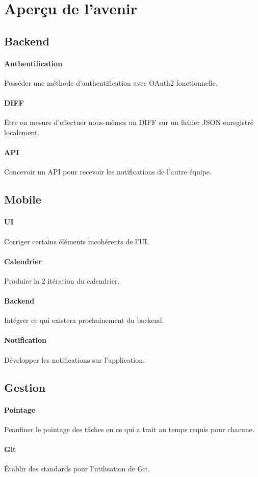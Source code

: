 \section{Aperçu de l'avenir}
	\subsection{Backend}

	\paragraph{Authentification} Posséder une méthode d'authentification avec OAuth2 fonctionnelle.

	\paragraph{DIFF} Être en mesure d'effectuer nous-mêmes un DIFF sur un fichier JSON enregistré localement.

	\paragraph{API} Concevoir un API pour recevoir les notifications de l'autre équipe.
	
	\subsection{Mobile}
	
	\paragraph{UI} Corriger certains éléments incohérents de l'UI.
	\paragraph{Calendrier} Produire la 2\ieme{} itération du calendrier.
	\paragraph{Backend} Intégrer ce qui existera prochainement du backend.
	\paragraph{Notification} Développer les notifications sur l'application.
	
	\subsection{Gestion}
	
	\paragraph{Pointage} Peaufiner le pointage des tâches en ce qui a trait au temps requis pour chacune.
	\paragraph{Git} Établir des standards pour l'utilisation de Git.